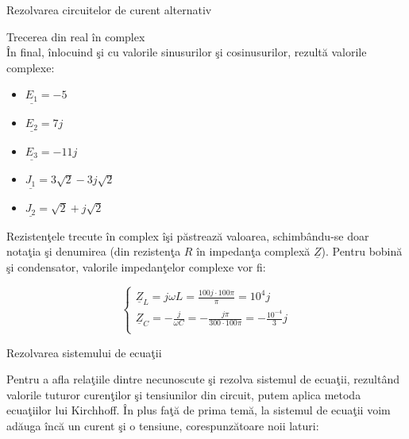 \documentclass[a4paper]{article}
\begin{document}
\begin{section}{Rezolvarea circuitelor de curent alternativ}
\begin{subsection}{Trecerea din real \^ in complex\\}
	\^ In final, \^ inlocuind \c si cu valorile sinusurilor \c si cosinusurilor, rezult\u a valorile complexe:

\begin{multicols}{2}
\begin{large}
	\begin{itemize}
		\item $ \underline{E_1} = -5 $
		\item $ \underline{E_2} = 7j $
		\item $ \underline{E_3} = -11j $
		
		\item $ \underline{J_1} = 3\sqrt2 -3j \sqrt2 $
		\item $ \underline{J_2} = \sqrt2 + j \sqrt2 $ \\
	\end{itemize} \par
\end{large}
\end{multicols}

	Rezisten\c tele trecute \^ in complex \^ i\c si p\u astreaz\u a valoarea, schimb\^ andu-se doar nota\c tia \c si denumirea (din rezisten\c ta $ R $ \^ in impedan\c ta complex\u a $ \underline{Z} $). Pentru bobin\u a \c si condensator, valorile impedan\c telor complexe vor fi: \\

\begin{large} \[ \left\{ \begin{array}{ll}
		\underline{Z}_L = j \omega L = \frac{100 j \cdot 100 \pi}{\pi} = 10^4j \\[0.1cm]
		\underline{Z}_C = -\frac{j}{\omega C} = -\frac{j \pi}{300 \cdot 100 \pi} = -\frac{10^{-4}}{3} j \\
\end{array} \right. \] \end{large}

\end{subsection}
\pagebreak

\begin{subsection}{Rezolvarea sistemului de ecua\c tii \\}

	Pentru a afla rela\c tiile dintre necunoscute \c si rezolva sistemul de ecua\c tii, rezult\^ and valorile tuturor curen\c tilor \c si tensiunilor din circuit, putem aplica metoda ecua\c tiilor lui Kirchhoff. \^ In plus fa\c t\u a de prima tem\u a, la sistemul de ecua\c tii voim ad\u auga \^ inc\u a un curent \c si o tensiune, corespunz\u atoare noii laturi:
 

\end{subsection}
\end{section}
\end{document}
